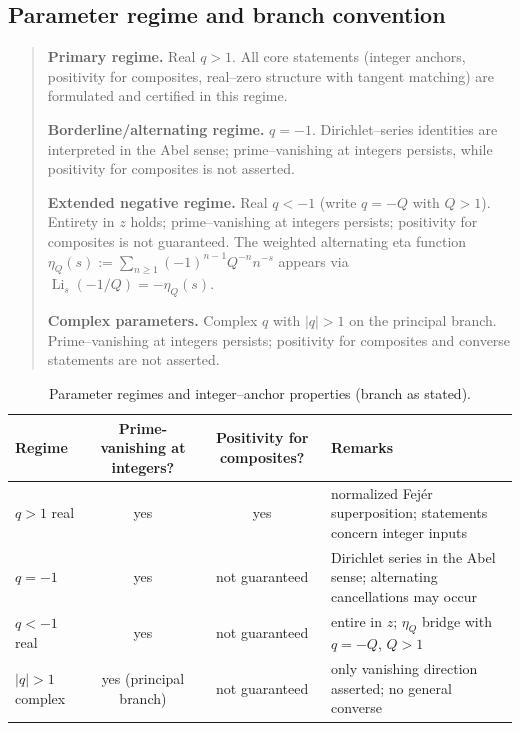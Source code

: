 \subsection*{Parameter regime and branch convention}\label{app:param-branch}
\begin{quote}
\textbf{Primary regime.} Real $q>1$. All core statements (integer anchors, positivity for composites, real–zero structure with tangent matching) are formulated and certified in this regime.

\textbf{Borderline/alternating regime.} $q=-1$. Dirichlet–series identities are interpreted in the Abel sense; prime–vanishing at integers persists, while positivity for composites is not asserted.

\textbf{Extended negative regime.} Real $q<-1$ (write $q=-Q$ with $Q>1$). Entirety in $z$ holds; prime–vanishing at integers persists; positivity for composites is not guaranteed. The weighted alternating eta function
$\eta_Q(s):=\sum_{n\ge1}(-1)^{n-1}Q^{-n}n^{-s}$ appears via $\operatorname{Li}_s(-1/Q)=-\eta_Q(s)$.

\textbf{Complex parameters.} Complex $q$ with $|q|>1$ on the principal branch. Prime–vanishing at integers persists; positivity for composites and converse statements are not asserted.
\end{quote}

\begin{table}[h!]
\centering
\small
\setlength{\tabcolsep}{4pt}
\begin{tabularx}{\linewidth}{@{}l c c X@{}}
\toprule
Regime & Prime-vanishing at integers? & Positivity for composites? & Remarks \\
\midrule
$q>1$ real      & yes & yes & normalized Fej\'er superposition; statements concern integer inputs \\
$q=-1$          & yes & not guaranteed & Dirichlet series in the Abel sense; alternating cancellations may occur \\
$q<-1$ real     & yes & not guaranteed & entire in $z$; $\eta_Q$ bridge with $q=-Q$, $Q>1$ \\
$|q|>1$ complex & yes (principal branch) & not guaranteed & only vanishing direction asserted; no general converse \\
\bottomrule
\end{tabularx}
\caption{Parameter regimes and integer–anchor properties (branch as stated).}
\label{tab:regimes}
\end{table}

